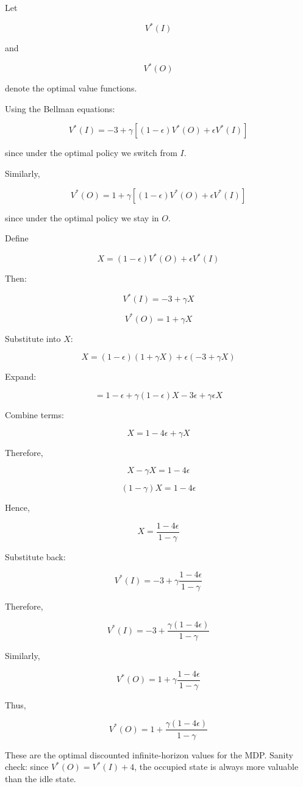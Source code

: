 \documentclass[12pt]{article}
\begin{document}
Let

\[
V^\ast(I)
\]

and

\[
V^\ast(O)
\]

denote the optimal value functions.

Using the Bellman equations:

\[
V^\ast(I)
=
-3
+
\gamma
\left[
(1-\epsilon)V^\ast(O)
+
\epsilon V^\ast(I)
\right]
\]

since under the optimal policy we switch from \(I\).

Similarly,

\[
V^\ast(O)
=
1
+
\gamma
\left[
(1-\epsilon)V^\ast(O)
+
\epsilon V^\ast(I)
\right]
\]

since under the optimal policy we stay in \(O\).

Define

\[
X
=
(1-\epsilon)V^\ast(O)
+
\epsilon V^\ast(I)
\]

Then:

\[
V^\ast(I)=-3+\gamma X
\]

\[
V^\ast(O)=1+\gamma X
\]

Substitute into \(X\):

\[
X
=
(1-\epsilon)(1+\gamma X)
+
\epsilon(-3+\gamma X)
\]

Expand:

\[
=
1-\epsilon+\gamma(1-\epsilon)X
-3\epsilon+\gamma\epsilon X
\]

Combine terms:

\[
X
=
1-4\epsilon+\gamma X
\]

Therefore,

\[
X-\gamma X
=
1-4\epsilon
\]

\[
(1-\gamma)X
=
1-4\epsilon
\]

Hence,

\[
X
=
\frac{1-4\epsilon}{1-\gamma}
\]

Substitute back:

\[
V^\ast(I)
=
-3
+
\gamma
\frac{1-4\epsilon}{1-\gamma}
\]

Therefore,

\[
\boxed{
V^\ast(I)
=
-3
+
\frac{\gamma(1-4\epsilon)}{1-\gamma}
}
\]

Similarly,

\[
V^\ast(O)
=
1
+
\gamma
\frac{1-4\epsilon}{1-\gamma}
\]

Thus,

\[
\boxed{
V^\ast(O)
=
1
+
\frac{\gamma(1-4\epsilon)}{1-\gamma}
}
\]

These are the optimal discounted infinite-horizon values for the MDP.
Sanity check: since $V^\ast(O)=V^\ast(I)+4$, the occupied state is always more valuable than the idle state.
\end{document}
